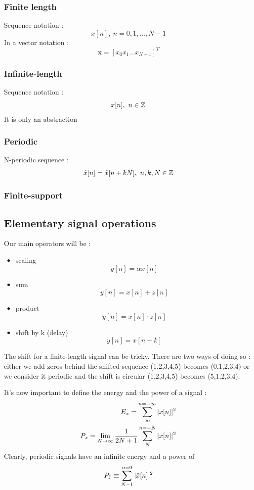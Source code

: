 \documentclass[11pt,a4paper]{article}
\numberwithin{equation}{section}
\begin{document}
\subsubsection{Finite length}
Sequence notation :
\begin{equation}
    x[n],\ n=0,1,\ldots,N-1
\end{equation}
In a vector notation : 
\begin{equation}
    \mathbf{x} = [x_0x_1...x_{N-1}]^T
\end{equation}
\subsubsection{Infinite-length}
Sequence notation : 
\begin{equation}
    x[n],\ n\in \Z
\end{equation}
It is only an abstraction

\subsubsection{Periodic}
N-periodic sequence : 
\begin{equation}
    \tilde{x}[n] = \tilde{x}[n+kN],\ n,k,N \in \Z
\end{equation}
\subsubsection{Finite-support}
\subsection{Elementary signal operations}
Our main operators will be :
\begin{itemize}
    \item scaling
        \[y[n] = \alpha x[n]\]
    \item sum
        \[y[n] = x[n] + z[n]\]
    \item product
        \[y[n] = x[n] \cdot z[n]\]
    \item shift by k (delay)
        \[y[n] = x[n-k]\]
\end{itemize}
The shift for a finite-length signal can be tricky. There are two ways of doing so : either we add zeros behind the shifted sequence (1,2,3,4,5) becomes (0,1,2,3,4) or we consider it periodic and the shift is circular (1,2,3,4,5) becomes (5,1,2,3,4).

It's now important to define the energy and the power of a signal : 
\begin{align}
    E_x = \somme{n=-\infty}{\infty}|x[n]|^2\\
    P_x = \limite{N\to\infty} \frac{1}{2N+1} \somme{n=-N}{N}|x[n]|^2
\end{align}
Clearly, periodic signals have an infinite energy and a power of 
\[P_{\tilde{x}} \equiv \somme{n=0}{N-1}|\tilde{x}[n]|^2\]
\end{document}
